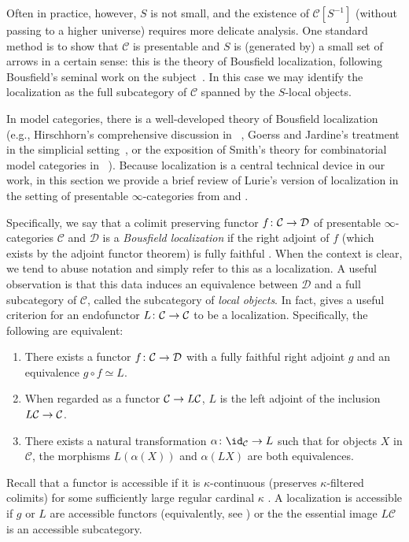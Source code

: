 \documentclass{amsart}
\newcommand{\htp}{\simeq}
\renewcommand{\to}{\mathchoice{\longrightarrow}{\rightarrow}{\rightarrow}{\rightarrow}}
\let\catsymbfont\mathcal
\newcommand{\aC}{{\catsymbfont{C}}}
\newcommand{\aD}{{\catsymbfont{D}}}
\renewcommand{\i}{\infty}
\numberwithin{equation}{section}
\theoremstyle{definition}
\begin{document}
Often in practice, however, $S$ is not small, and the existence of
$\aC[S^{-1}]$ (without passing to a higher universe) requires more
delicate analysis. One standard method is to show that $\aC$ is
presentable and $S$ is (generated by) a small set of arrows in a certain sense: this is
the theory of Bousfield localization, following Bousfield's seminal
work on the subject~\cite{Bousfield}.  In this case we may identify
the localization as the full subcategory of $\aC$ spanned by the
$S$-local objects.

In model categories, there is a well-developed theory of
Bousfield localization (e.g., Hirschhorn's comprehensive discussion in
~\cite{Hirschhorn}, Goerss and Jardine's treatment in the simplicial
setting~\cite{GoerssJardine}, or the exposition of Smith's theory for
combinatorial model categories in ~\cite{BarwickLoc}).  Because
localization is a central technical device in our work, in this
section we provide a brief review of Lurie's version of localization
in the setting of presentable $\i$-categories from \cite[\S 5.2.7]{HTT}
and \cite[\S 5.5.4]{HTT}.

Specifically, we say that a colimit preserving functor $f \colon \aC \to \aD$
of presentable $\infty$-categories $\aC$ and $\aD$ is a {\em Bousfield
localization} if the right adjoint of $f$ (which exists by the adjoint
functor theorem) is fully faithful \cite[5.2.7.2]{HTT}.  When the
context is clear, we tend to abuse notation and simply refer to this
as a localization. A useful observation is that this data induces an
equivalence between $\aD$ and a full subcategory of $\aC$, called the
subcategory of {\em local objects}.  In fact, \cite[5.2.7.4]{HTT}
gives a useful criterion for an endofunctor $L \colon \aC \to \aC$ to
be a localization.  Specifically, the following are equivalent: 

\begin{enumerate}
\item There exists a functor $f \colon \aC \to \aD$ with a fully
faithful right adjoint $g$ and an equivalence $g \circ f \htp L$.
\item When regarded as a functor $\aC \to L\aC$, $L$ is the left
adjoint of the inclusion $L\aC \to \aC$.
\item There exists a natural transformation
$\alpha \colon \id_{\aC} \to L$ such that for objects $X$ in $\aC$,
the morphisms $L(\alpha(X))$ and $\alpha(LX)$ are both equivalences.
\end{enumerate}

Recall that a functor is accessible if it is $\kappa$-continuous
(preserves $\kappa$-filtered colimits) for some sufficiently large
regular cardinal $\kappa$ \cite[5.4.2.5]{HTT}.  A localization is
accessible if $g$ or $L$ are accessible functors (equivalently,
see \cite[5.5.1.2]{HTT}) or the the essential image $L\aC$ is an
accessible subcategory.
\end{document}
